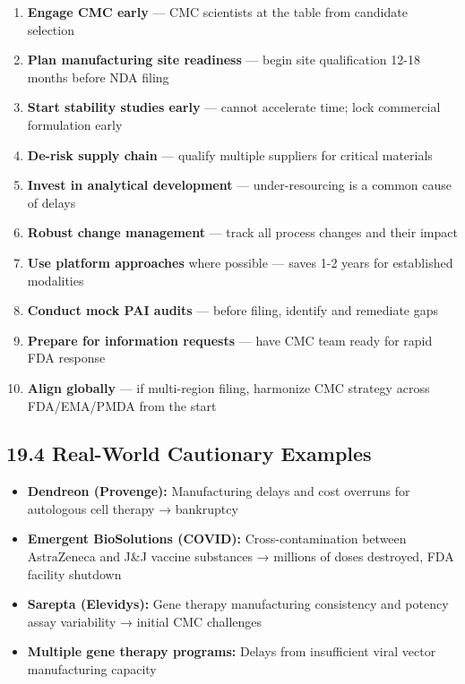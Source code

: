 \documentclass[
  11pt,
  a4paper,
]{report}
\providecommand{\tightlist}{%
  \setlength{\itemsep}{0pt}\setlength{\parskip}{0pt}}
\begin{document}
\begin{enumerate}
\def\labelenumi{\arabic{enumi}.}
\tightlist
\item
  \textbf{Engage CMC early} --- CMC scientists at the table from
  candidate selection
\item
  \textbf{Plan manufacturing site readiness} --- begin site
  qualification 12-18 months before NDA filing
\item
  \textbf{Start stability studies early} --- cannot accelerate time;
  lock commercial formulation early
\item
  \textbf{De-risk supply chain} --- qualify multiple suppliers for
  critical materials
\item
  \textbf{Invest in analytical development} --- under-resourcing is a
  common cause of delays
\item
  \textbf{Robust change management} --- track all process changes and
  their impact
\item
  \textbf{Use platform approaches} where possible --- saves 1-2 years
  for established modalities
\item
  \textbf{Conduct mock PAI audits} --- before filing, identify and
  remediate gaps
\item
  \textbf{Prepare for information requests} --- have CMC team ready for
  rapid FDA response
\item
  \textbf{Align globally} --- if multi-region filing, harmonize CMC
  strategy across FDA/EMA/PMDA from the start
\end{enumerate}

\hypertarget{real-world-cautionary-examples}{%
\subsection{19.4 Real-World Cautionary
Examples}\label{real-world-cautionary-examples}}

\begin{itemize}
\tightlist
\item
  \textbf{Dendreon (Provenge):} Manufacturing delays and cost overruns
  for autologous cell therapy → bankruptcy
\item
  \textbf{Emergent BioSolutions (COVID):} Cross-contamination between
  AstraZeneca and J\&J vaccine substances → millions of doses destroyed,
  FDA facility shutdown
\item
  \textbf{Sarepta (Elevidys):} Gene therapy manufacturing consistency
  and potency assay variability → initial CMC challenges
\item
  \textbf{Multiple gene therapy programs:} Delays from insufficient
  viral vector manufacturing capacity
\end{itemize}
\end{document}
